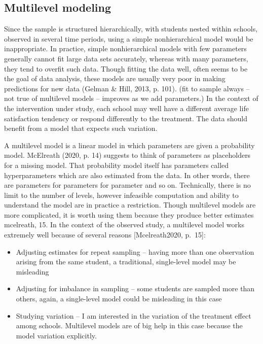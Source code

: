 \documentclass[a4, 12pt]{article}
\begin{document}
\hypertarget{multilevel-modeling}{%
\subsection{Multilevel modeling}\label{multilevel-modeling}}

Since the sample is structured hierarchically, with students nested within schools, observed in several time periods, using a simple nonhierarchical model would be inappropriate. In practice, simple nonhierarchical models with few parameters generally cannot fit large data sets accurately, whereas with many parameters, they tend to overfit such data. Though fitting the data well, often seems to be the goal of data analysis, these models are usually very poor in making predictions for new data (Gelman \& Hill, 2013, p. 101). (fit to sample always -- not true of multilevel models -- improves as we add parameters.) In the context of the intervention under study, each school may well have a different average life satisfaction tendency or respond differently to the treatment. The data should benefit from a model that expects such variation.

A multilevel model is a linear model in which parameters are given a probability model. McElreath (2020, p. 14) suggests to think of parameters as placeholders for a missing model. That probability model itself has parameters called hyperparameters which are also estimated from the data. In other words, there are parameters for parameters for parameter and so on. Technically, there is no limit to the number of levels, however infeasible computation and ability to understand the model are in practice a restriction. Though multilevel models are more complicated, it is worth using them because they produce better estimates mcelreath, 15. In the context of the observed study, a multilevel model works extremely well because of several reasons {[}Mcelreath2020, p.~15{]}:

\begin{itemize}
\item Adjusting estimates for repeat sampling -- having more than one observation arising from the same student, a traditional, single-level model may be misleading
\item Adjusting for imbalance in sampling -- some students are sampled more than others, again, a single-level model could be misleading in this case
\item Studying variation -- I am interested in the variation of the treatment effect among schools. Multilevel models are of big help in this case because the model variation explicitly.
\end{itemize}
\end{document}
